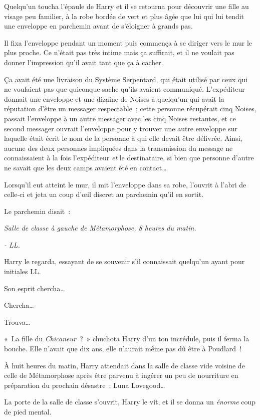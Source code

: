 Quelqu'un toucha l'épaule de Harry et il se retourna pour découvrir une fille au visage peu familier, à la robe bordée de vert et plus âgée que lui qui lui tendit une enveloppe en parchemin avant de s'éloigner à grands pas.

Il fixa l'enveloppe pendant un moment puis commença à se diriger vers le mur le plus proche.
Ce n'était pas très intime mais ça suffirait, et il ne voulait pas donner l'impression qu'il avait tant que ça à cacher.

Ça avait été une livraison du Système Serpentard, qui était utilisé par ceux qui ne voulaient pas que quiconque sache qu'ils avaient communiqué.
L'expéditeur donnait une enveloppe et une dizaine de Noises à quelqu'un qui avait la réputation d'être un messager respectable~; cette personne récupérait cinq Noises, passait l'enveloppe à un autre messager avec les cinq Noises restantes, et ce second messager ouvrait l'enveloppe pour y trouver une autre enveloppe sur laquelle était écrit le nom de la personne à qui elle devait être délivrée.
Ainsi, aucune des deux personnes impliquées dans la transmission du message ne connaissaient à la fois l'expéditeur \emph{et} le destinataire, si bien que personne d'autre ne savait que les deux camps avaient été en contact…

Lorsqu'il eut atteint le mur, il mit l'enveloppe dans sa robe, l'ouvrit à l'abri de celle-ci et jeta un coup d'œil discret au parchemin qu'il en sortit.

Le parchemin disait~:

\emph{Salle de classe à gauche de Métamorphose, 8 heures du matin.}

\emph{- LL.}

Harry le regarda, essayant de se souvenir s'il connaissait quelqu'un ayant pour initiales LL.

Son esprit chercha…

Chercha…

Trouva…

«~La fille du \emph{Chicaneur}~?~»
chuchota Harry d'un ton incrédule, puis il ferma la bouche.
Elle n'avait que dix ans, elle n'aurait même pas dû être à Poudlard~!


À huit heures du matin, Harry attendait dans la salle de classe vide voisine de celle de Métamorphose après être parvenu à ingérer un peu de nourriture en préparation du prochain désastre~: Luna Lovegood…

La porte de la salle de classe s'ouvrit, Harry le vit, et il se donna un \emph{énorme} coup de pied mental.

